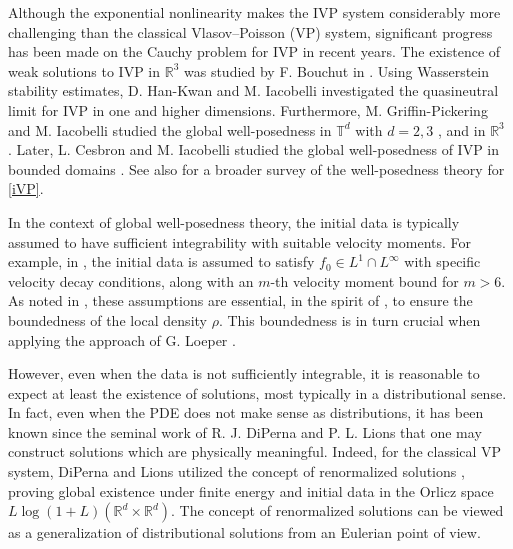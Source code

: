 \documentclass[11pt,reqno,a4paper]{amsart}
\newcommand{\R}{\mathbb{R}}
\theoremstyle{definition}
\theoremstyle{remark}
\numberwithin{equation}{section}
\newcommand{\T} {\mathbb T}
\begin{document}
%
%
%
%
%




Although the exponential nonlinearity makes the IVP system considerably more challenging than the classical Vlasov--Poisson (VP) system, significant progress has been made on the Cauchy problem for IVP in recent years. The existence of weak solutions to IVP in $\R^3$ was studied by F. Bouchut in \cite{bouchut1991}.  Using Wasserstein stability estimates, D. Han-Kwan and M. Iacobelli \cite{hankwaniacobelli2017a,hankwaniacobelli2017b} investigated the quasineutral limit for IVP in one and higher dimensions. Furthermore, M. Griffin-Pickering and M. Iacobelli studied the global well-posedness in $\T^d$ with $d=2,3$ \cite{griffinpickeringiacobelli2021Torus}, and in $\R^3$ \cite{griffinpickeringiacobelli2021Strong}. Later, L. Cesbron and M. Iacobelli studied the global well-posedness of IVP in bounded domains \cite{cesbroniacobelli2023}. See also \cite{griffinpickeringiacobelli2021Recent} for a broader survey of the well-posedness theory for \eqref{iVP}. 

In the context of global well-posedness theory, the initial data is typically assumed to have sufficient integrability with suitable velocity moments. For example, in \cite{griffinpickeringiacobelli2021Torus}, the initial data is assumed to satisfy $f_0 \in L^1 \cap L^\infty$ with specific velocity decay conditions, along with an $m$-th velocity moment bound for $m > 6$. As noted in \cite[Remark 1.5]{griffinpickeringiacobelli2021Strong}, these assumptions are essential, in the spirit of \cite{lionsperthame1991}, to ensure the boundedness of the local density $\rho$. This boundedness is in turn crucial when applying the approach of G. Loeper \cite{loeper2006}.
 
However, even when the data is not sufficiently integrable, it is reasonable to expect at least the existence of solutions, most typically in a distributional sense. In fact, even when the PDE does not make sense as distributions, it has been known since the seminal work of R. J. DiPerna and P. L. Lions that one may construct solutions which are physically meaningful. Indeed, for the classical VP system, DiPerna and Lions utilized the concept of renormalized solutions \cite{dipernalions1988,dipernalions1989a}, proving global existence under finite energy and initial data in the Orlicz space $L\log (1+L)(\R^d\times\R^d)$. The concept of renormalized solutions can be viewed as a generalization of distributional solutions from an Eulerian point of view.
\end{document}

